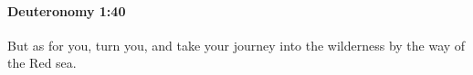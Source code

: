 
		\paragraph{Deuteronomy 1:40} %
			\label{DEUTERONOMY-1-40}

			But as for you, turn you, and take your journey into the wilderness by the way of the Red sea.


